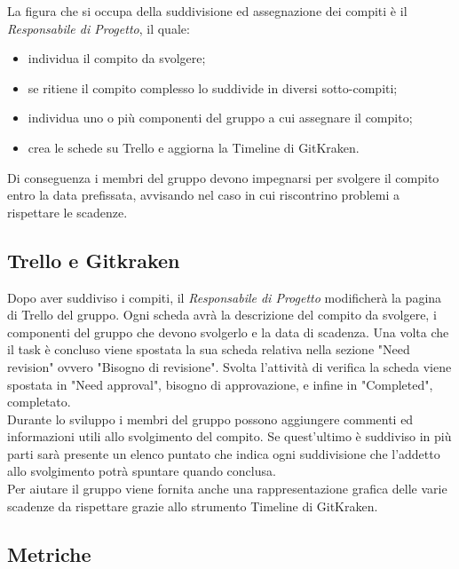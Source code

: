 La figura che si occupa della suddivisione ed assegnazione dei compiti è il \textit{Responsabile di Progetto}, il quale:
\begin{itemize}
	\item individua il compito da svolgere;
	\item se ritiene il compito complesso lo suddivide in diversi sotto-compiti;
	\item individua uno o più componenti del gruppo a cui assegnare il compito;
	\item crea le schede su Trello e aggiorna la Timeline di GitKraken.
\end{itemize}

Di conseguenza i membri del gruppo devono impegnarsi per svolgere il compito entro la data prefissata, avvisando nel caso in cui riscontrino problemi a rispettare le scadenze.

\subsection{Trello e Gitkraken}\label{4.2.4}

Dopo aver suddiviso i compiti, il \textit{Responsabile di Progetto} modificherà la pagina di Trello del gruppo. Ogni scheda avrà la descrizione del compito da svolgere, i componenti del gruppo che devono svolgerlo e la data di scadenza.
Una volta che il task è concluso viene spostata la sua scheda relativa nella sezione "Need revision" ovvero "Bisogno di revisione".
Svolta l'attività di verifica la scheda viene spostata in "Need approval", bisogno di approvazione, e infine in "Completed", completato.\\
Durante lo sviluppo i membri del gruppo possono aggiungere commenti ed informazioni utili allo svolgimento del compito. Se quest'ultimo è suddiviso in più parti sarà presente un elenco puntato che indica ogni suddivisione che l'addetto allo svolgimento potrà spuntare quando conclusa. \\
Per aiutare il gruppo viene fornita anche una rappresentazione grafica delle varie scadenze da rispettare grazie allo strumento Timeline di GitKraken.

\subsection{Metriche}\label{4.2.5}

